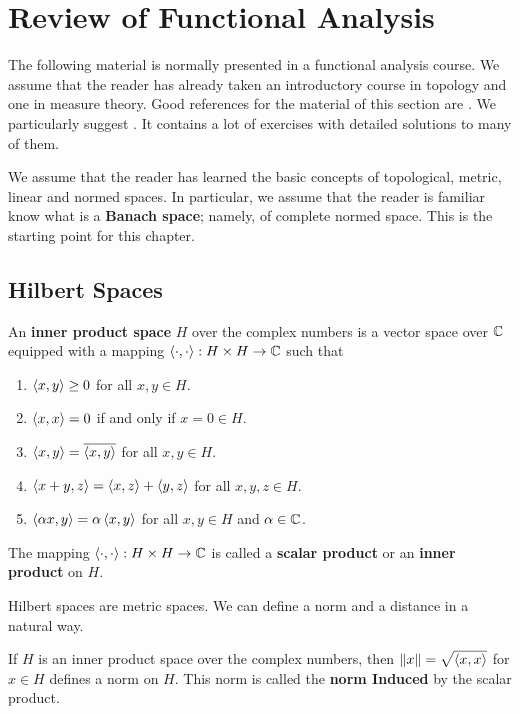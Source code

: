 \chapter{Review of Functional Analysis} \label{ChapterRevFunctAnal}

The following material is normally presented in a functional analysis
course.   We assume that the reader has already taken an introductory
course in topology and one in measure theory.  Good references for
the material of this section are \cite{Br,ReeSim,Ru,RuFA}.  We
particularly suggest \cite{Br}.  It contains a lot of exercises with
detailed solutions to many of them.

We assume that the reader has learned the basic concepts of
topological, metric, linear and normed spaces.  In particular, we assume that
the reader is familiar know what is a
{\bfseries Banach space}; namely, of complete
normed space.  This is the starting point for this chapter.

\section{Hilbert Spaces}

\begin{defn}
An {\bfseries inner product space}
$H$ over the complex numbers is a vector
space over $\mathbb{C}$ equipped with a mapping
$\left\langle{\cdot} , {\cdot}\right\rangle:H\times H \rightarrow \mathbb{C}$ such that
\begin{enumerate}
\item $\left\langle{x} , {y}\right\rangle \geq 0$ for all $x,y \in H$.
\item $\left\langle{x} , {x}\right\rangle = 0$ if and only if $x=0 \in H$.
\item $\left\langle{x} , {y}\right\rangle = \overline{\left\langle{x} , {y}\right\rangle}$ for all $x,y \in H$.
\item $\left\langle{x+y} , {z}\right\rangle = \left\langle{x} , {z}\right\rangle + \left\langle{y} , {z}\right\rangle$ for all $x,y,z \in H$.
\item $\left\langle{\alpha x} , {y}\right\rangle = \alpha \left\langle{x} , {y}\right\rangle$ for all $x,y \in H$ and
$\alpha \in \mathbb{C}$.
\end{enumerate}
The mapping $\left\langle{\cdot} , {\cdot}\right\rangle:H\times H \rightarrow \mathbb{C}$ is called a
{\bfseries scalar product} or an
{\bfseries inner product} on $H$.
\end{defn}

Hilbert spaces are metric spaces.  We can define a norm and a distance
in a natural way.

\begin{theorem}
If $H$ is an inner product space over the complex numbers, then
$\displaystyle \| x \| = \sqrt{\left\langle{x} , {x}\right\rangle}$ for $x \in H$ defines a
norm on $H$.  This norm is called the
{\bfseries norm Induced} by the scalar product. 
\end{theorem}

